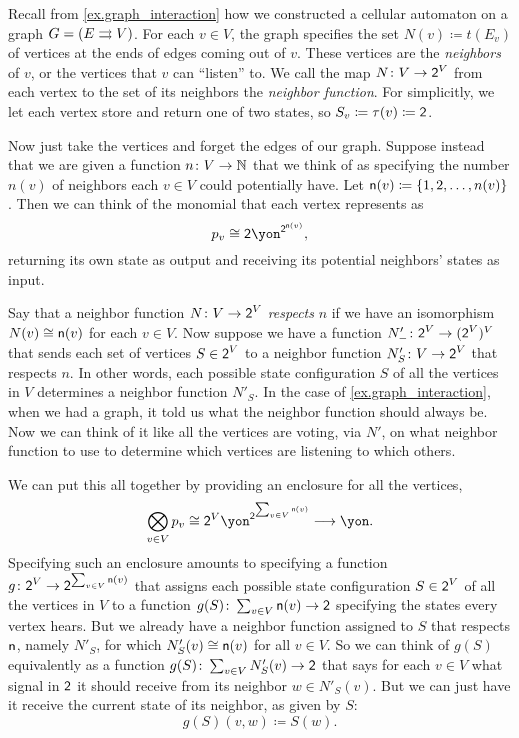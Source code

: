 \documentclass[Book-Poly]{subfiles}
\begin{document}
\begin{example}\label{ex.cell_auto_vote_interaction}
Recall from \cref{ex.graph_interaction} how we constructed a cellular automaton on a graph $G=(E\rightrightarrows V)$.
For each $v\in V$, the graph specifies the set $N(v)\coloneqq t(E_v)$ of vertices at the ends of edges coming out of $v$.
These vertices are the \emph{neighbors} of $v$, or the vertices that $v$ can ``listen'' to.
We call the map $N\colon V\to\textsf{2}^V$ from each vertex to the set of its neighbors the \emph{neighbor function}.
For simplicitly, we let each vertex store and return one of two states, so $S_v\coloneqq\tau(v)\coloneqq\textsf{2}$.

Now just take the vertices and forget the edges of our graph.
Suppose instead that we are given a function $n\colon V\to\mathbb{N}$ that we think of as specifying the number $n(v)$ of neighbors each $v\in V$ could potentially have.
Let $\mathsf{n}(v)\coloneqq\{1,2,\ldots,n(v)\}$.
Then we can think of the monomial that each vertex represents as
\[
    p_v\iso\2\yon^{\2^{\ord{n}(v)}},
\]
returning its own state as output and receiving its potential neighbors' states as input.

Say that a neighbor function $N\colon V\to\textsf{2}^V$ \emph{respects} $n$ if we have an isomorphism $N(v)\cong\mathsf{n}(v)$ for each $v\in V$.
Now suppose we have a function $N'_-\colon \textsf{2}^V\to (\textsf{2}^V)^V$ that sends each set of vertices $S\in\textsf{2}^V$ to a neighbor function $N'_S\colon V\to \textsf{2}^V$ that respects $n$.
In other words, each possible state configuration $S$ of all the vertices in $V$ determines a neighbor function $N'_S$.
In the case of \cref{ex.graph_interaction}, when we had a graph, it told us what the neighbor function should always be.
Now we can think of it like all the vertices are voting, via $N'$, on what neighbor function to use to determine which vertices are listening to which others.

We can put this all together by providing an enclosure for all the vertices,
\begin{equation}\label{eqn.polymap_misc9237}
    \bigotimes_{v\in V}p_v\cong\2^V\yon^{\2^{\sum_{v\in V}\ord{n}(v)}}\too\yon.
\end{equation}
Specifying such an enclosure amounts to specifying a function $g\colon \textsf{2}^V\to\textsf{2}^{\sum_{v\in V}\mathsf{n}(v)}$ that assigns each possible state configuration $S\in\textsf{2}^V$ of all the vertices in $V$ to a function $g(S)\colon\sum_{v\in V}\mathsf{n}(v)\to\textsf{2}$ specifying the states every vertex hears.
But we already have a neighbor function assigned to $S$ that respects $\mathsf{n}$, namely $N'_S$, for which $N'_S(v)\cong\mathsf{n}(v)$ for all $v\in V$.
So we can think of $g(S)$ equivalently as a function $g(S)\colon\sum_{v\in V}N'_S(v)\to\textsf{2}$ that says for each $v\in V$ what signal in $\textsf{2}$ it should receive from its neighbor $w\in N'_S(v)$.
But we can just have it receive the current state of its neighbor, as given by $S$:
\[
    g(S)(v,w)\coloneqq S(w).
\]


\end{example}
\end{document}
